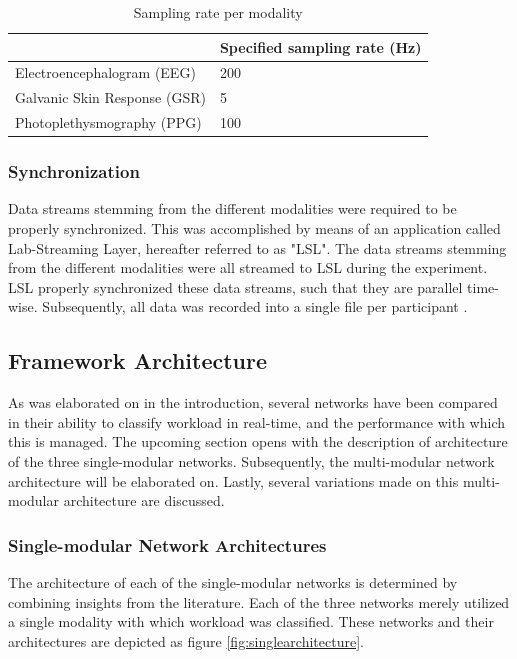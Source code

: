 \documentclass[12pt]{article}
\begin{document}
\bgroup
\def\arraystretch{1.6}%
\begin{table}[h]
\centering
\bigskip
\caption{Sampling rate per modality}
\label{table:samplingrate}
\begin{tabular}{ll}
    & Specified sampling rate (Hz) \\ \hline
 Electroencephalogram (EEG) & 200                         \\
Galvanic Skin Response (GSR) & 5                           \\
Photoplethysmography (PPG) & 100                         \\ \hline
\end{tabular}
\end{table}
\bigskip
\egroup

\subsubsection{Synchronization}
Data streams stemming from the different modalities were required to be properly synchronized. This was accomplished by means of an application called Lab-Streaming Layer, hereafter referred to as "LSL". The data streams stemming from the different modalities were all streamed to LSL during the experiment. LSL properly synchronized these data streams, such that they are parallel time-wise. Subsequently, all data was recorded into a single file per participant \cite{kothe2018lab}.

\subsection{Framework Architecture}
As was elaborated on in the introduction, several networks have been compared in their ability to classify workload in real-time, and the performance with which this is managed. The upcoming section opens with the description of architecture of the three single-modular networks. Subsequently, the multi-modular network architecture will be elaborated on. Lastly, several variations made on this multi-modular architecture are discussed. 

\subsubsection{Single-modular Network Architectures}
The architecture of each of the single-modular networks is determined by combining insights from the literature. Each of the three networks merely utilized a single modality with which workload was classified. These networks and their architectures are depicted as figure \ref{fig:singlearchitecture}.
\end{document}
